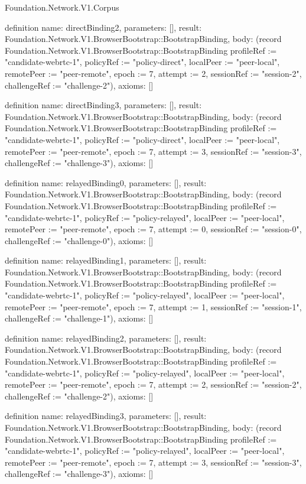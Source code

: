\begin{lexlean}{Foundation.Network.V1.Corpus}
\begin{semanticmodule}
definition{
  name: directBinding2,
  parameters: [],
  result: Foundation.Network.V1.BrowserBootstrap::BootstrapBinding,
  body: (record Foundation.Network.V1.BrowserBootstrap::BootstrapBinding {profileRef := "candidate-webrtc-1", policyRef := "policy-direct", localPeer := "peer-local", remotePeer := "peer-remote", epoch := 7, attempt := 2, sessionRef := "session-2", challengeRef := "challenge-2"}),
  axioms: []
}

definition{
  name: directBinding3,
  parameters: [],
  result: Foundation.Network.V1.BrowserBootstrap::BootstrapBinding,
  body: (record Foundation.Network.V1.BrowserBootstrap::BootstrapBinding {profileRef := "candidate-webrtc-1", policyRef := "policy-direct", localPeer := "peer-local", remotePeer := "peer-remote", epoch := 7, attempt := 3, sessionRef := "session-3", challengeRef := "challenge-3"}),
  axioms: []
}

definition{
  name: relayedBinding0,
  parameters: [],
  result: Foundation.Network.V1.BrowserBootstrap::BootstrapBinding,
  body: (record Foundation.Network.V1.BrowserBootstrap::BootstrapBinding {profileRef := "candidate-webrtc-1", policyRef := "policy-relayed", localPeer := "peer-local", remotePeer := "peer-remote", epoch := 7, attempt := 0, sessionRef := "session-0", challengeRef := "challenge-0"}),
  axioms: []
}

definition{
  name: relayedBinding1,
  parameters: [],
  result: Foundation.Network.V1.BrowserBootstrap::BootstrapBinding,
  body: (record Foundation.Network.V1.BrowserBootstrap::BootstrapBinding {profileRef := "candidate-webrtc-1", policyRef := "policy-relayed", localPeer := "peer-local", remotePeer := "peer-remote", epoch := 7, attempt := 1, sessionRef := "session-1", challengeRef := "challenge-1"}),
  axioms: []
}

definition{
  name: relayedBinding2,
  parameters: [],
  result: Foundation.Network.V1.BrowserBootstrap::BootstrapBinding,
  body: (record Foundation.Network.V1.BrowserBootstrap::BootstrapBinding {profileRef := "candidate-webrtc-1", policyRef := "policy-relayed", localPeer := "peer-local", remotePeer := "peer-remote", epoch := 7, attempt := 2, sessionRef := "session-2", challengeRef := "challenge-2"}),
  axioms: []
}

definition{
  name: relayedBinding3,
  parameters: [],
  result: Foundation.Network.V1.BrowserBootstrap::BootstrapBinding,
  body: (record Foundation.Network.V1.BrowserBootstrap::BootstrapBinding {profileRef := "candidate-webrtc-1", policyRef := "policy-relayed", localPeer := "peer-local", remotePeer := "peer-remote", epoch := 7, attempt := 3, sessionRef := "session-3", challengeRef := "challenge-3"}),
  axioms: []
}


\end{semanticmodule}
\end{lexlean}
